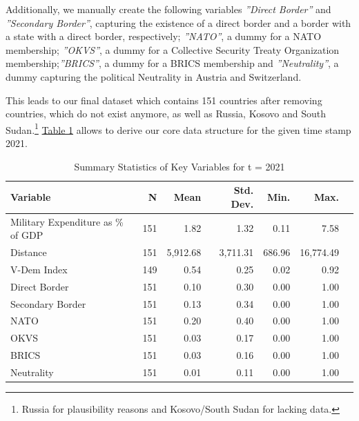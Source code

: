 \documentclass[12pt,a4paper]{article}
\begin{document}
Additionally, we manually create the following variables \textit{''Direct Border''} and \textit{''Secondary Border''}, capturing the existence of a direct border and a border with a state with a direct border, respectively; \textit{''NATO''}, a dummy for a NATO membership; \textit{''OKVS''}, a dummy for a Collective Security Treaty Organization membership;\textit{''BRICS''}, a dummy for a BRICS membership and \textit{''Neutrality''}, a dummy capturing the political Neutrality in Austria and Switzerland. 


This leads to our final dataset which contains 151 countries after removing countries, which do not exist anymore, as well as Russia, Kosovo and South Sudan.\footnote{Russia for plausibility reasons	and Kosovo/South Sudan for lacking data.} \hyperref[t:1]{\color{blue} Table 1} allows to derive our core data structure for the given time stamp 2021.


\begin{table}[h]
\label{t:1}
\caption{Summary Statistics of Key Variables for t = 2021}
\begin{tabular}{lrrrrrr}
\hline \hline
Variable & N & Mean & Std. Dev. & Min. & Max. \\ \hline
Military Expenditure as \% of GDP & 151 & 1.82 & 1.32 & 0.11 & 7.58 \\
Distance &   151  &  5,912.68 &   3,711.31 & 686.96 &  16,774.49 \\
V-Dem Index & 149 & 0.54& 0.25 & 0.02 & 0.92 \\
Direct Border & 151 & 0.10 & 0.30 & 0.00 & 1.00 \\
Secondary Border & 151 & 0.13 & 0.34 & 0.00 &          1.00 \\
NATO & 151& 0.20 & 0.40 & 0.00 & 1.00 \\         
OKVS & 151 & 0.03  & 0.17 & 0.00 & 1.00 \\
BRICS & 151  & 0.03 & 0.16 & 0.00 & 1.00 \\          
Neutrality & 151   &  0.01 &   0.11 & 0.00 & 1.00 \\     \hline\hline
\end{tabular}
\end{table}
 
\end{document}
